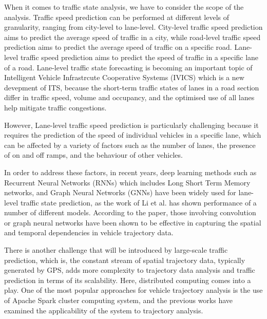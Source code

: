 \documentclass[11pt]{uonthesis}
\begin{document}
When it comes to traffic state analysis, we have to consider the scope of the analysis. Traffic speed prediction can be performed at different levels of granularity, ranging from city-level to lane-level. City-level traffic speed prediction aims to predict the average speed of traffic in a city, while road-level traffic speed prediction aims to predict the average speed of traffic on a specific road. Lane-level traffic speed prediction aims to predict the speed of traffic in a specific lane of a road. Lane-level traffic state forecasting is becoming an important topic of Intelligent Vehicle Infrastrcute Cooperative Systems (IVICS) which is a new devepment of ITS, because the short-term traffic states of lanes in a road section differ in traffic speed, volume and occupancy\cite{GU20191}, and the optimised use of all lanes help mitigate traffic congestions. 

However, Lane-level traffic speed prediction is particularly challenging because it requires the prediction of the speed of individual vehicles in a specific lane, which can be affected by a variety of factors such as the number of lanes, the presence of on and off ramps, and the behaviour of other vehicles.

In order to address these factors, in recent years, deep learning methods such as Recurrent Neural Networks (RNNs) which includes Long Short Term Memory networks, and Graph Neural Networks (GNNs) have been widely used for lane-level traffic state prediction, as the work of Li et al.\cite{li2024unifyinglaneleveltrafficprediction} has shown performance of a number of different models. According to the paper, those involving convolution or graph neural networks have been shown to be effective in capturing the spatial and temporal dependencies in vehicle trajectory data.

There is another challenge that will be introduced by large-scale traffic prediction, which is, the constant stream of spatial trajectory data, typically generated by GPS, adds more complexity to trajectory data analysis and traffic prediction in terms of its scalability. Here, distributed computing comes into a play. One of the most popular approaches for vehicle trajectory analysis is the use of Apache Spark cluster computing system, and the previous works\cite{9077707}\cite{Sigurdsson2018RoadTC} have examined the applicability of the system to trajectory analysis.
\end{document}
